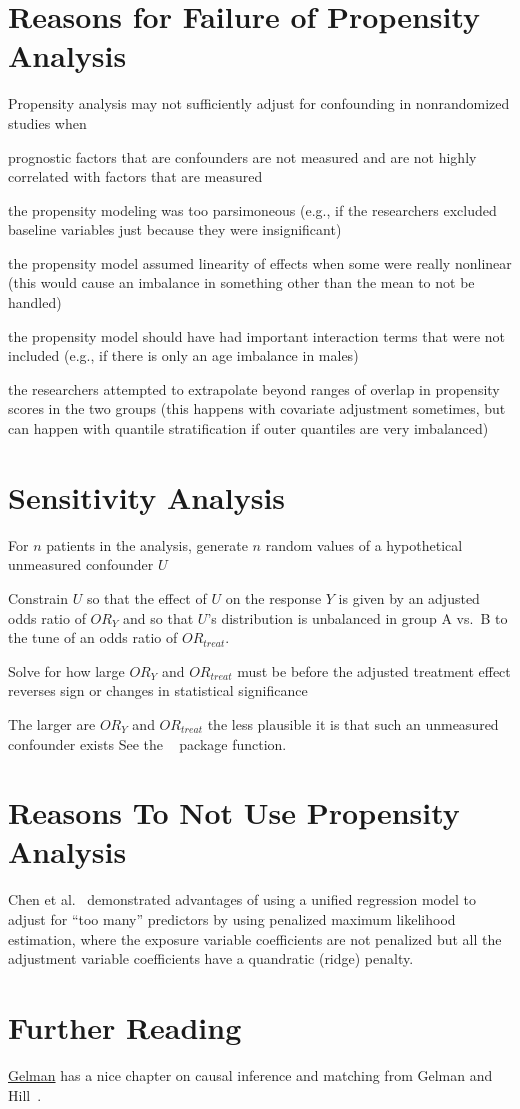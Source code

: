 \section{Reasons for Failure of Propensity Analysis}
Propensity analysis may not sufficiently adjust for confounding in nonrandomized studies when
\bi
\item prognostic factors that are confounders are not measured and are not highly correlated with factors that are measured
\item the propensity modeling was too parsimoneous (e.g., if the researchers excluded baseline variables just because they were insignificant)
\item the propensity model assumed linearity of effects when some were really nonlinear (this would cause an imbalance in something other than the mean to not be handled)
\item the propensity model should have had important interaction terms that were not included (e.g., if there is only an age imbalance in males)
\item the researchers attempted to extrapolate beyond ranges of overlap in propensity scores in the two groups (this happens with covariate adjustment sometimes, but can happen with quantile stratification if outer quantiles are very imbalanced)
\ei

\section{Sensitivity Analysis}
\bi
\item For $n$ patients in the analysis, generate $n$ random values of
  a hypothetical unmeasured confounder $U$
\item Constrain $U$ so that the effect of $U$ on the response $Y$ is
  given by an adjusted odds ratio of $OR_{Y}$ and so that $U$'s distribution is
  unbalanced in group A vs.\ B to the tune of an odds ratio of
  $OR_{treat}$.
\item Solve for how large $OR_{Y}$ and $OR_{treat}$ must be before the
  adjusted treatment effect reverses sign or changes in statistical
  significance
\item The larger are $OR_Y$ and $OR_{treat}$ the less plausible it is
  that such an unmeasured confounder exists
\ei
See the \R\  package  function.

\section{Reasons To Not Use Propensity Analysis}
Chen et al.~\cite{che16too} demonstrated advantages of using a unified
regression model to adjust for ``too many'' predictors by using
penalized maximum likelihood estimation, where the exposure variable
coefficients are not penalized but all the adjustment variable
coefficients have a quandratic (ridge) penalty.

\section{Further Reading}
\href{http://www.stat.columbia.edu/~gelman/arm/chap10.pdf}{Gelman} has
a nice chapter on causal inference and matching from Gelman and
Hill~\cite{gel06dat}. 
